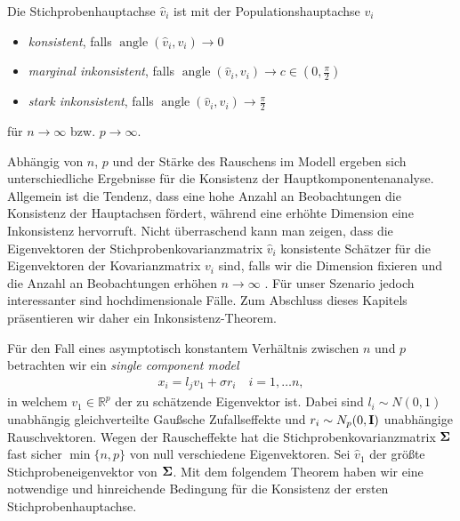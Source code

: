 \begin{defn}
Die Stichprobenhauptachse $\hat{v}_i$ ist mit der Populationshauptachse $v_i$
\begin{itemize}
\item \textit{konsistent}, falls $\operatorname{angle}(\widehat{v}_i, v_i) \longrightarrow 0$
\item \textit{marginal inkonsistent}, falls $\operatorname{angle}(\widehat{v}_i, v_i) \longrightarrow c \in (0,\frac{\pi}{2})$
\item \textit{stark inkonsistent}, falls $\operatorname{angle}(\widehat{v}_i, v_i) \longrightarrow \frac{\pi}{2}$
\end{itemize} 
für $n \to \infty$ bzw. $p \rightarrow \infty$. 
\end{defn}

Abhängig von $n$, $p$ und der Stärke des Rauschens im Modell ergeben sich unterschiedliche Ergebnisse für die Konsistenz der Hauptkomponentenanalyse. Allgemein ist die Tendenz, dass eine hohe Anzahl an Beobachtungen die Konsistenz der Hauptachsen fördert, während eine erhöhte Dimension eine Inkonsistenz hervorruft. Nicht überraschend kann man zeigen, dass die Eigenvektoren der Stichprobenkovarianzmatrix $\widehat{v}_i$ konsistente Schätzer für die Eigenvektoren der Kovarianzmatrix $v_i$ sind, falls wir die Dimension fixieren und die Anzahl an Beobachtungen erhöhen $n \rightarrow \infty$ \cite{anderson}. Für unser Szenario jedoch interessanter sind hochdimensionale Fälle. Zum Abschluss dieses Kapitels präsentieren wir daher ein Inkonsistenz-Theorem.

Für den Fall eines asymptotisch konstantem Verhältnis zwischen $n$ und $p$ betrachten wir ein \textit{single component model} \cite{johnstone}
\begin{align}
\label{single_component_model}
x_i = l_j v_1 + \sigma r_i \quad i = 1, \ldots n,
\end{align}
in welchem $v_1 \in \mathbb{R}^p$ der zu schätzende Eigenvektor ist. Dabei sind $l_i \sim N(0,1)$ unabhängig gleichverteilte Gaußsche Zufallseffekte und $r_i \sim N_p(0, \mathbf{I})$ unabhängige Rauschvektoren. Wegen der Rauscheffekte hat die Stichprobenkovarianzmatrix $\mathbf{\Sigma}$ fast sicher $\min\{n,p\}$ von null verschiedene Eigenvektoren. Sei $\widehat{v}_1$ der größte Stichprobeneigenvektor von $\mathbf{\Sigma}$. Mit dem folgendem Theorem haben wir eine notwendige und hinreichende Bedingung für die Konsistenz der ersten Stichprobenhauptachse.


